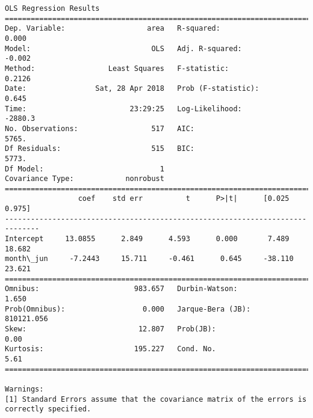 \documentclass[11pt]{article}
\begin{document}
\begin{Verbatim}[commandchars=\\\{\}]
                            OLS Regression Results                            
==============================================================================
Dep. Variable:                   area   R-squared:                       0.000
Model:                            OLS   Adj. R-squared:                 -0.002
Method:                 Least Squares   F-statistic:                    0.2126
Date:                Sat, 28 Apr 2018   Prob (F-statistic):              0.645
Time:                        23:29:25   Log-Likelihood:                -2880.3
No. Observations:                 517   AIC:                             5765.
Df Residuals:                     515   BIC:                             5773.
Df Model:                           1                                         
Covariance Type:            nonrobust                                         
==============================================================================
                 coef    std err          t      P>|t|      [0.025      0.975]
------------------------------------------------------------------------------
Intercept     13.0855      2.849      4.593      0.000       7.489      18.682
month\_jun     -7.2443     15.711     -0.461      0.645     -38.110      23.621
==============================================================================
Omnibus:                      983.657   Durbin-Watson:                   1.650
Prob(Omnibus):                  0.000   Jarque-Bera (JB):           810121.056
Skew:                          12.807   Prob(JB):                         0.00
Kurtosis:                     195.227   Cond. No.                         5.61
==============================================================================

Warnings:
[1] Standard Errors assume that the covariance matrix of the errors is correctly specified.



\end{Verbatim}
\end{document}

